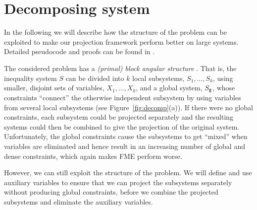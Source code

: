 %
%
\section{Decomposing system}
In the following we will describe how the structure of the problem can be exploited to make our projection framework perform better on large systems. Detailed pseudocode and proofs can be found in \cite{MyTechRep}. 

The considered problem has a \emph{(primal) block angular structure} \cite{williams}. That is, the inequality system $S$ can be divided into $k$ local subsystems, $S_1, \ldots, S_k$, using smaller, disjoint sets of variables, $X_1, \ldots, X_k$, and a global system, $S_{\texttt{g}}$, whose constraints ``connect'' the otherwise independent subsystem by using variables from several local subsystems (see Figure~\ref{fig:decomp}(a)). 
%
If there were no global constraints, each subsystem could be projected separately and the resulting systems could then be combined to give the projection of the original system. 
Unfortunately, the global constraints cause the subsystems to get ``mixed'' when variables are eliminated and hence result in an increasing number of global and dense constraints, which again makes FME perform worse.

However, we can still exploit the structure of the problem. We will define and use auxiliary variables to ensure that we can project the subsystems separately without producing global constraints, before we combine the projected  subsystems and eliminate the auxiliary variables.
 

